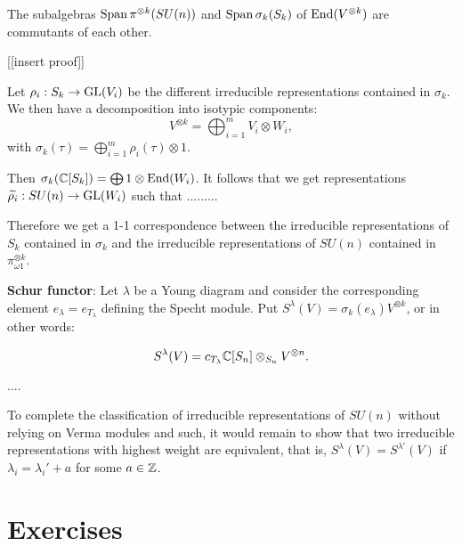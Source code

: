 \documentclass[11pt, english]{article}
\begin{document}
\begin{thm}
The subalgebras $\operatorname{Span} \pi^{\otimes k}(SU(n))$ and $\operatorname{Span} \sigma_k(S_k)$ of $\operatorname{End}(V^{\otimes k})$ are commutants of each other.
\end{thm}

[[insert proof]]

Let $\rho_i: S_k \to \operatorname{GL}(V_i)$ be the different irreducible representations contained in $\sigma_k$. We then have a decomposition into isotypic components:
$$
V^{\otimes k} = \bigoplus_{i=1}^m V_i \otimes W_i,
$$
with $\sigma_k(\tau) = \bigoplus_{i=1}^m \rho_i(\tau) \otimes 1$. 

Then $\sigma_k(\mathbb{C}[S_k]) = \bigoplus 1 \otimes \operatorname{End}(W_i)$. It follows that we get representations $\widetilde{\rho_i}: SU(n) \to \operatorname{GL}(W_i)$ such that
.........

Therefore we get a 1-1 correspondence between the irreducible representations of $S_k$ contained in $\sigma_k$ and the irreducible representations of $SU(n)$ contained in $\pi_{\omega1}^{\otimes k}$. 



\textbf{Schur functor}: Let $\lambda$ be a Young diagram and consider the corresponding element $e_\lambda = e_{T_\lambda}$ defining the Specht module. Put $S^\lambda(V) = \sigma_k(e_\lambda) V^{\otimes k}$, or in other words:

$$
S^{\lambda}(V) = c_{T_\lambda} \mathbb{C}[S_n] \otimes_{S_n} V^{\otimes n}.
$$

....

\begin{remark}
 To complete the classification of irreducible representations of $SU(n)$ without relying on Verma modules and such, it would remain to show that two irreducible representations with highest weight are equivalent, that is, $S^\lambda(V)=S^{\lambda'}(V)$ if $\lambda_i = \lambda_i'+a$ for some $a \in \mathbb{Z}$.
\end{remark}

\newpage
\appendix
\section{Exercises}
\end{document}

